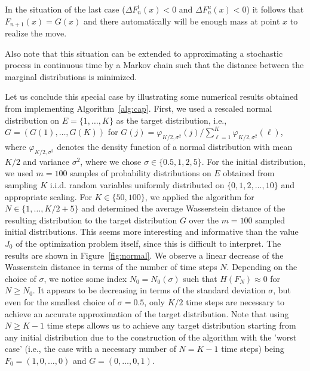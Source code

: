 \documentclass[reqno, 12pt]{amsart}%
\theoremstyle{definition}
\numberwithin{equation}{section} \numberwithin{theorem}{section}
\begin{document}
In the situation of the last case ($\Delta F_n^{l}(x)<0$ and $\Delta F_n^{u}(x)<0$) it follows that $F_{n+1}(x) = G(x)$ and there  automatically will be enough mass at point $x$ to realize the move.

Also note that this situation can be extended to approximating a stochastic process in continuous time by a Markov chain such that the distance between the marginal distributions is minimized.


Let us conclude this special case by illustrating some numerical results obtained from implementing Algorithm~\ref{alg:cap}. First, we used a rescaled normal distribution on $E=\{1,\ldots,K\}$ as the target distribution, i.e., $G = (G(1),\ldots,G(K))$ for $G(j) = \varphi_{K/2,\sigma^2}(j)/\sum_{\ell = 1}^K \varphi_{K/2,\sigma^2}(\ell)$, where $\varphi_{K/2,\sigma^2}$ denotes the density function of a normal distribution with mean $K/2$ and variance $\sigma^2$, where we chose $\sigma\in \{0.5,1,2,5\}$. For the initial distribution, we used $m=100$ samples of probability distributions on $E$ obtained from sampling $K$ i.i.d. random variables uniformly distributed on $\{0,1,2,\ldots,10\}$ and appropriate scaling. For $K\in \{50,100\}$, we applied the algorithm for $N\in \{1,\ldots,K/2+5\}$ and determined the average Wasserstein distance of the resulting distribution to the target distribution $G$ over the $m=100$ sampled initial distributions. This seems more interesting and informative than the value $J_0$ of the optimization problem itself, since this is difficult to interpret.  The results are shown in Figure~\ref{fig:normal}. We observe a linear decrease of the Wasserstein distance in terms of the number of time steps $N$. Depending on the choice of $\sigma$, we notice some index $N_0 = N_0(\sigma)$ such that $H(F_N) \approx 0$ for $N\geq N_0$. It appears to be decreasing in terms of the standard deviation $\sigma$, but even for the smallest choice of $\sigma = 0.5$, only $K/2$ time steps are necessary to achieve an accurate approximation of the target distribution. Note that using $N\geq K-1$ time steps allows us to achieve any target distribution starting from any initial distribution due to the construction of the algorithm with the 'worst case' (i.e., the case with a necessary number of $N=K-1$ time steps) being $F_0 = (1,0,\ldots,0)$ and $G=(0,\ldots,0,1)$.
\end{document}
